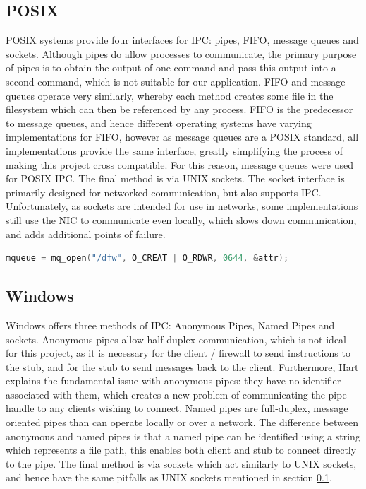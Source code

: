 \documentclass[a4paper, 11pt]{report}
\begin{document}
\subsection{POSIX} \label{posixipc}
\acrshort{POSIX} systems provide four interfaces for \acrshort{IPC}: pipes, FIFO, message queues and sockets. Although pipes do allow processes to communicate, the primary purpose of pipes is to obtain the output of one command and pass this output into a second command, which is not suitable for our application. FIFO and message queues operate very similarly, whereby each method creates some file in the filesystem which can then be referenced by any process. FIFO is the predecessor to message queues, and hence different operating systems have varying implementations for FIFO, however as message queues are a \acrshort{POSIX} standard, all implementations provide the same interface, greatly simplifying the process of making this project cross compatible. For this reason, message queues were used for \acrshort{POSIX} \acrshort{IPC}. The final method is via UNIX sockets. The socket interface is primarily designed for networked communication, but also supports \acrshort{IPC}. Unfortunately, as sockets are intended for use in networks, some implementations still use the \acrshort{NIC} to communicate even locally, which slows down communication, and adds additional points of failure.

\begin{lstlisting}[language=c,style=c,caption=Creating the message queue on a POSIX OS]
mqueue = mq_open("/dfw", O_CREAT | O_RDWR, 0644, &attr);
\end{lstlisting}

\subsection{Windows}
Windows\cite{windows} offers three methods of \acrshort{IPC}: Anonymous Pipes, Named Pipes and sockets. Anonymous pipes allow half-duplex communication, which is not ideal for this project, as it is necessary for the client / firewall to send instructions to the \gls{stub}, and for the \gls{stub} to send messages back to the client. Furthermore, Hart\cite{windowsprog} explains the fundamental issue with anonymous pipes: they have no identifier associated with them, which creates a new problem of communicating the pipe handle to any clients wishing to connect. Named pipes are full-duplex, message oriented pipes than can operate locally or over a network. The difference between anonymous and named pipes is that a named pipe can be identified using a string which represents a file path, this enables both client and \gls{stub} to connect directly to the pipe. The final method is via sockets which act similarly to UNIX sockets, and hence have the same pitfalls as UNIX sockets mentioned in section \ref{posixipc}.\\
\end{document}
